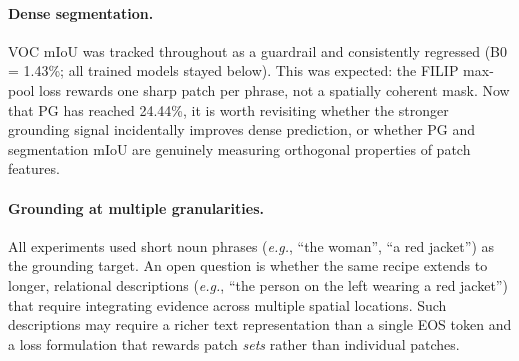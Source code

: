 \documentclass{article}
\newcommand{\eg}{\textit{e.g.}}
\begin{document}
\paragraph{Dense segmentation.}
VOC mIoU was tracked throughout as a guardrail and consistently regressed
(B0 = 1.43\%; all trained models stayed below). This was expected: the
FILIP max-pool loss rewards one sharp patch per phrase, not a spatially
coherent mask. Now that PG has reached 24.44\%, it is worth revisiting
whether the stronger grounding signal incidentally improves dense prediction,
or whether PG and segmentation mIoU are genuinely measuring orthogonal
properties of patch features.

\paragraph{Grounding at multiple granularities.}
All experiments used short noun phrases (\eg, ``the woman'', ``a red jacket'')
as the grounding target. An open question is whether the same recipe extends
to longer, relational descriptions (\eg, ``the person on the left wearing a
red jacket'') that require integrating evidence across multiple spatial
locations. Such descriptions may require a richer text representation than
a single EOS token and a loss formulation that rewards patch \emph{sets}
rather than individual patches.

\end{document}
